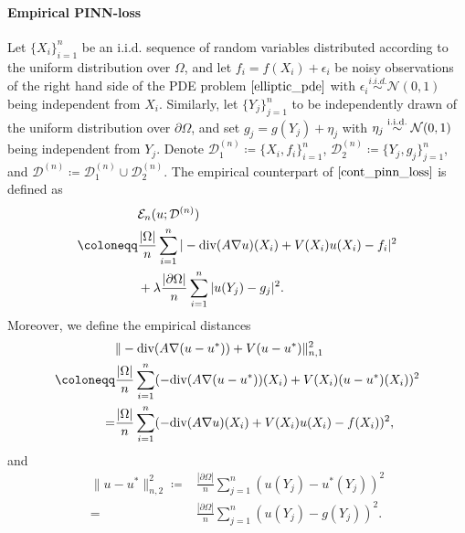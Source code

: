 \documentclass{article}
\newcommand{\N}{\mathcal{N}}
\newcommand{\D}{\mathcal{D}}
\renewcommand{\div}{\textnormal{div}}
\theoremstyle{plain}
\theoremstyle{definition}
\theoremstyle{remark}
\begin{document}
\paragraph{Empirical PINN-loss}
Let $\{X_i\}_{i=1}^n$ be an i.i.d. sequence of random variables distributed according to the uniform distribution over $\Omega$, and let $f_i = f(X_i) + \epsilon_i$ be noisy observations of the right hand side of the PDE problem $\eqref{elliptic_pde}$ with $\epsilon_{i} \overset{i.i.d.}{\sim} \N(0, 1)$ being independent from $X_i$. Similarly, let $\{Y_j\}_{j=1}^n$ to be independently drawn of the uniform distribution over $\partial \Omega$, and set $g_j = g(Y_j) + \eta_j$ with $\eta_j \overset{\textnormal{i.i.d.}}{\sim } \N(0, 1)$ being independent from $Y_j$. Denote $\D_1^{(n)} \coloneqq \{X_i, f_i\}_{i=1}^n$, $\D_2^{(n)} \coloneqq \{Y_j, g_j\}_{j=1}^n$, and $\D^{(n)} \coloneqq \D_1^{(n)} \cup \D_2^{(n)}$. The empirical counterpart of $\eqref{cont_pinn_loss}$ is  defined as
\begin{equation} \label{empirical_loss}
\begin{aligned}
     & \mathcal{E}_n(u; \D^{(n)}) \\ \coloneqq & \frac{|\Omega|}{n} \sum_{i=1}^n |-\div(A \nabla u)(X_i) + V(X_i) u(X_i) - f_i|^2 \\
    & + \lambda \frac{|\partial \Omega|}{n} \sum_{i=1}^n |u(Y_j) - g_j|^2. 
\end{aligned}
\end{equation}
Moreover, we define the empirical distances 
\begin{equation}\label{empirical_dist1}
    \begin{aligned}
         & \|-\div (A \nabla (u - u^*)) + V(u - u^*) \|_{n, 1}^2 \\\coloneqq & \frac{|\Omega|}{n} \sum_{i=1}^n (-\div (A \nabla (u - u^*))(X_i) + V(X_i)(u - u^*)(X_i))^2 \\
         = & \frac{|\Omega|}{n} \sum_{i=1}^n (-\div(A \nabla u)(X_i) + V(X_i) u(X_i) - f(X_i))^2,
    \end{aligned}
    \end{equation}
    and 
    \begin{equation}\label{empirical_dist2}
    \begin{aligned}
         \|u - u^*\|_{n, 2}^2  \coloneqq & \frac{ |\partial \Omega|}{n} \sum_{j=1}^n (u(Y_j) - u^*(Y_j))^2 \\=& \frac{|\partial \Omega|}{n} \sum_{j=1}^n (u(Y_j) - g(Y_j))^2. 
    \end{aligned}
    \end{equation}
\end{document}
